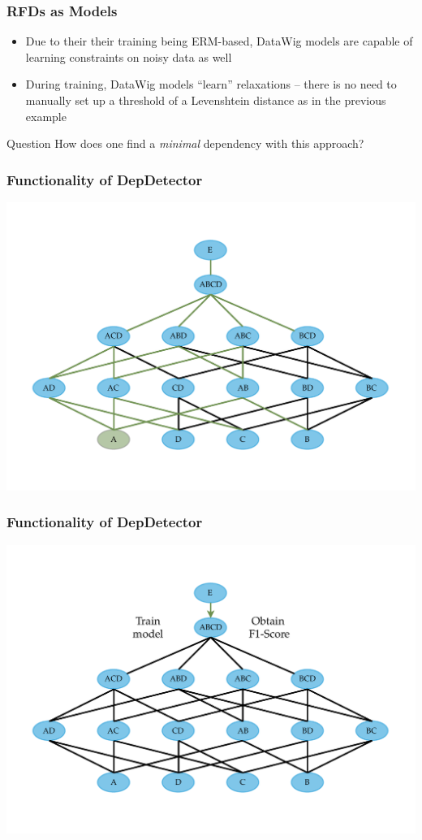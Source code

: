 \documentclass{beamer}
\begin{document}
\begin{frame}
    \frametitle{RFDs as Models}
    \begin{itemize}
        \item Due to their their training being ERM-based, DataWig models are capable of learning constraints on noisy data as well
        \item During training, DataWig models ``learn'' relaxations -- there is no need to manually set up a threshold of a Levenshtein distance as in the previous example
    \end{itemize}
    \pause
    \begin{block}{Question}
        How does one find a \emph{minimal} dependency with this approach?
    \end{block}
\end{frame}

\begin{frame}
    \frametitle{Functionality of DepDetector}
    \includegraphics[width=.95\textwidth]{search-tree-fd.pdf}
\end{frame}

\begin{frame}
    \frametitle{Functionality of DepDetector}
    \includegraphics[width=.95\textwidth]{min-dep-step-1.pdf}
\end{frame}
\end{document}
